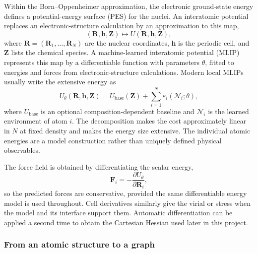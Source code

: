 \documentclass[10pt,a4paper,twocolumn]{article}
\begin{document}
Within the Born--Oppenheimer approximation, the electronic ground-state
energy defines a potential-energy surface (PES) for the nuclei. An
interatomic potential replaces an electronic-structure calculation by an
approximation to this map,
\begin{equation}
  (\bm R,\bm h,\bm Z)\longmapsto
  U(\bm R,\bm h,\bm Z),
\end{equation}
where $\bm R=(\bm R_1,\ldots,\bm R_N)$ are the nuclear coordinates,
$\bm h$ is the periodic cell, and $\bm Z$ lists the chemical species. A
machine-learned interatomic potential (MLIP) represents this map by a
differentiable function with parameters $\theta$, fitted to energies and
forces from electronic-structure calculations. Modern local MLIPs usually
write the extensive energy as
\begin{equation}
  U_\theta(\bm R,\bm h,\bm Z)
  = U_{\mathrm{base}}(\bm Z)
  + \sum_{i=1}^{N}\varepsilon_i(\mathcal N_i;\theta),
  \label{eq:mlip-energy}
\end{equation}
where $U_{\mathrm{base}}$ is an optional composition-dependent baseline and
$\mathcal N_i$ is the learned environment of atom $i$. The decomposition
makes the cost approximately linear in $N$ at fixed density and makes the
energy size extensive. The individual atomic energies are a model
construction rather than uniquely defined physical observables.

The force field is obtained by differentiating the scalar energy,
\begin{equation}
  \bm F_i=-\frac{\partial U_\theta}{\partial \bm R_i},
  \label{eq:mlip-force}
\end{equation}
so the predicted forces are conservative, provided the same differentiable
energy model is used throughout. Cell derivatives similarly give the virial
or stress when the model and its interface support them. Automatic
differentiation can be applied a second time to obtain the Cartesian Hessian
used later in this project.

\subsubsection{From an atomic structure to a graph}
\end{document}

